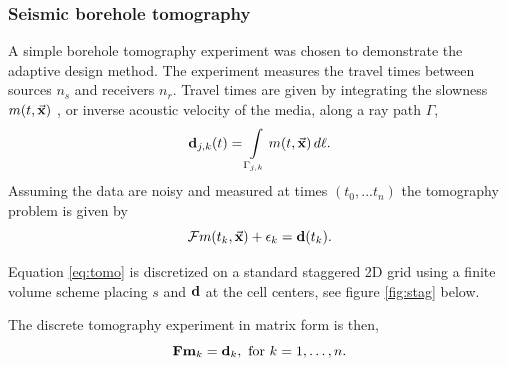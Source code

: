\documentclass[12pt]{article}
\newcommand{\bfF}	{{\bf{F}}}
\newcommand{\bfd}	{{\bf{d}}}
\newcommand{\bfm}	{{\bf{m}}}
\newcommand {\vx}    {\vec {\bf x}}
\newcommand{\CF} 	 {\mathcal{F}}    %
\begin{document}
\subsubsection{Seismic borehole tomography}
 A simple borehole tomography experiment was chosen to demonstrate the adaptive design method. The experiment measures the travel times between sources $n_s$ and receivers $n_r$. Travel times are given by integrating the slowness  $m(t,\vx)$ , or inverse acoustic velocity of the media,  along a ray path $\Gamma$,
\begin{equation*}\label{eq:tomo}
\bfd_{j,k}(t) =  \int\limits_{\Gamma_{j,k}} m(t,\vx)\, d\ell.
\end{equation*}
 Assuming the data are noisy and measured at times $(t_0,...t_n)$ the tomography problem is given by 
 \begin{equation*}
 \CF m(t_{k},\vx) + \epsilon_{k}  = \bfd(t_{k}).\\
\end{equation*}

Equation \eqref{eq:tomo} is discretized on a standard staggered 2D grid using a finite volume scheme placing $s$ and $\bfd$ at the cell centers, see figure \ref{fig:stag} below. 

The discrete tomography experiment in matrix form is then,
\begin{equation}
 	\bfF{\bfm_k} = \bfd_k, \text{ for } k=1,\ldots,n.
\end{equation}
\end{document}
